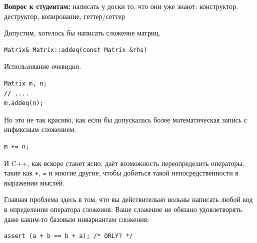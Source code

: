 \documentclass[a4paper,12pt,oneside]{book}
\newif\ifanswers
\begin{document}
\textbf{Вопрос к студентам:} написать у доски то, что они уже знают: конструктор, деструктор, копирование, геттер/сеттер

\ifanswers
Возможный ответ:

\begin{lstlisting}
class Matrix
{
  int m_n, m_m;
  int *m_buf;
public:
  Matrix (int n, int m) : 
    m_n (n), m_m (m), m_buf (new int[n*m]()) {}
  ~Matrix () { delete [] m_buf; }

  Matrix (const Matrix &rhs) : 
    m_n (rhs.m_n), m_m (rhs.m_m), m_buf (new int[m_n * m_m]) {
      std::memcpy (m_buf, rhs.m_buf, 
                   rhs.m_n * rhs.m_m * sizeof(int));
  }

  Matrix &operator=(const Matrix &rhs) {
    Matrix tmp{rhs};
    m_n = tmp.m_n; m_m = tmp.m_m;
    std::swap(m_buf, tmp.m_buf);
    return *this;
  }

  void set (int x, int y, int val) { m_buf[x*m_m + y] = val; }
  int get (int x, int y) const { return m_buf[x*m_m + y]; }
};
\end{lstlisting}
\fi

Допустим, хотелось бы написать сложение матриц.

\begin{lstlisting}
Matrix& Matrix::addeq(const Matrix &rhs)
\end{lstlisting}

Использование очевидно.

\begin{lstlisting}
Matrix m, n;
// ....
m.addeq(n);
\end{lstlisting}

Но это не так красиво, как если бы допускалась более математическая запись с инфиксным сложением.

\begin{lstlisting}
m += n;
\end{lstlisting}

И C++, как вскоре станет ясно, даёт возможность переопределить операторы, такие как \lstinline!+!, \lstinline!=! и многие другие, чтобы добиться такой непосредственности в выражении мыслей.

Главная проблема здесь в том, что вы действительно вольны написать любой код в определении оператора сложения. Ваше сложение не обязано удовлетворять даже каким-то базовым инвариантам сложения:

\begin{lstlisting}
assert (a + b == b + a); /* ORLY? */
\end{lstlisting}
\end{document}
